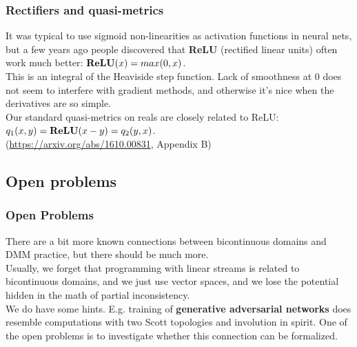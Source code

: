 \documentclass{beamer}
\newcommand{\relu}{\mbox{\bf ReLU}}
\begin{document}
\begin{frame}

  \frametitle{Rectifiers and quasi-metrics}

It was typical to use sigmoid non-linearities as activation functions in neural nets, but a few years ago people discovered that
{\bf ReLU} (rectified linear units) often work much better: $\relu(x) = max(0,x)$.\\[2ex]

This is an integral of the Heaviside step function. Lack of smoothness at 0 does not seem to
interfere with gradient methods, and otherwise it's nice when the derivatives are so simple.\\[2ex]

Our standard quasi-metrics on reals are closely related to ReLU:\\[2ex]

$q_1(x,y) = \relu(x-y) = q_2(y,x)$.\\[2ex]

(\url{https://arxiv.org/abs/1610.00831}, Appendix B)

\end{frame}

\subsection{Open problems}

\begin{frame}

   \frametitle{Open Problems}

   There are a bit more known connections between bicontinuous domains and DMM practice,
   but there should be much more.\\[2ex]

   Usually, we forget that programming with linear streams is related to bicontinuous domains,
   and we just use vector spaces,
   and we lose the potential hidden in the math of partial inconsistency.\\[2ex]

   We do have some hints. E.g. training of {\bf generative adversarial networks} does resemble computations
   with two Scott topologies and involution in spirit. One of the open problems is to investigate whether
   this connection can be formalized.
\end{frame}
\end{document}

